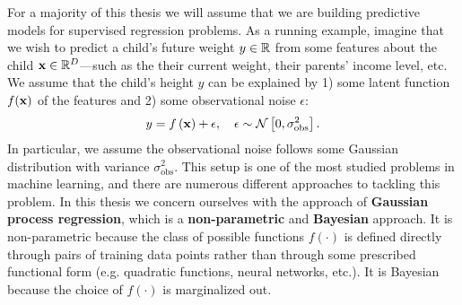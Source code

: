 For a majority of this thesis we will assume that we are building predictive models for supervised regression problems.
As a running example, imagine that we wish to predict a child's future weight $y \in \mathbb{R}$ from some features about the child $\mathbf{x} \in \mathbb{R}^{D}$---such as the their current weight, their parents' income level, etc.
We assume that the child's height $y$ can be explained by 1) some latent function $f(\mathbf{x})$ of the features and 2) some observational noise $\epsilon$:
%
\begin{equation}
  y = f \left( \bx \right) + \epsilon, \quad \epsilon \sim \normaldist{0}{\sigma_\text{obs}^2}.
  \label{eqn:regression}
\end{equation}
%
In particular, we assume the observational noise follows some Gaussian distribution with variance $\sigma_\text{obs}^2$.
%
This setup is one of the most studied problems in machine learning, and there are numerous different approaches to tackling this problem.
In this thesis we concern ourselves with the approach of {\bf Gaussian process regression}, which is a {\bf non-parametric} and {\bf Bayesian} approach.
It is non-parametric because the class of possible functions $f(\cdot)$ is defined directly through pairs of training data points
rather than through some prescribed functional form (e.g. quadratic functions, neural networks, etc.).
It is Bayesian because the choice of $f(\cdot)$ is marginalized out.

